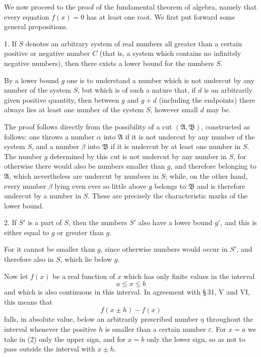 \documentclass[11pt]{article}
\begin{document}
We now proceed to the proof of the fundamental theorem of algebra, namely that every equation $f(x)=0$ has at least one root. We first put forward some general propositions.

1. If $S$ denotes an arbitrary system of real numbers all greater than a certain positive or negative number $C$ (that is, a system which contains no infinitely negative numbers), then there exists a lower bound for the numbers $S$.

By a lower bound $g$ one is to understand a number which is not undercut by any number of the system $S$, but which is of such a nature that, if $d$ is an arbitrarily given positive quantity, then between $g$ and $g+d$ (including the endpoints) there always lies at least one number of the system $S$, however small $d$ may be.

The proof follows directly from the possibility of a cut $(\mathfrak A,\mathfrak B)$, constructed as follows: one throws a number $\alpha$ into $\mathfrak A$ if it is not undercut by any number of the system $S$, and a number $\beta$ into $\mathfrak B$ if it is undercut by at least one number in $S$. The number $g$ determined by this cut is not undercut by any number in $S$, for otherwise there would also be numbers smaller than $g$, and therefore belonging to $\mathfrak A$, which nevertheless are undercut by numbers in $S$; while, on the other hand, every number $\beta$ lying even ever so little above $g$ belongs to $\mathfrak B$ and is therefore undercut by a number in $S$. These are precisely the characteristic marks of the lower bound.

2. If $S'$ is a part of $S$, then the numbers $S'$ also have a lower bound $g'$, and this is either equal to $g$ or greater than $g$.

For it cannot be smaller than $g$, since otherwise numbers would occur in $S'$, and therefore also in $S$, which lie below $g$.

Now let $f(x)$ be a real function of $x$ which has only finite values in the interval
\begin{equation}
 a\le x\le b
\tag{1}
\end{equation}
and which is also continuous in this interval. In agreement with \S\,31, V and VI, this means that
\begin{equation}
 f(x\pm h)-f(x)
\tag{2}
\end{equation}
falls, in absolute value, below an arbitrarily prescribed number $\eta$ throughout the interval whenever the positive $h$ is smaller than a certain number $\varepsilon$. For $x=a$ we take in (2) only the upper sign, and for $x=b$ only the lower sign, so as not to pass outside the interval with $x\pm h$.
\end{document}
